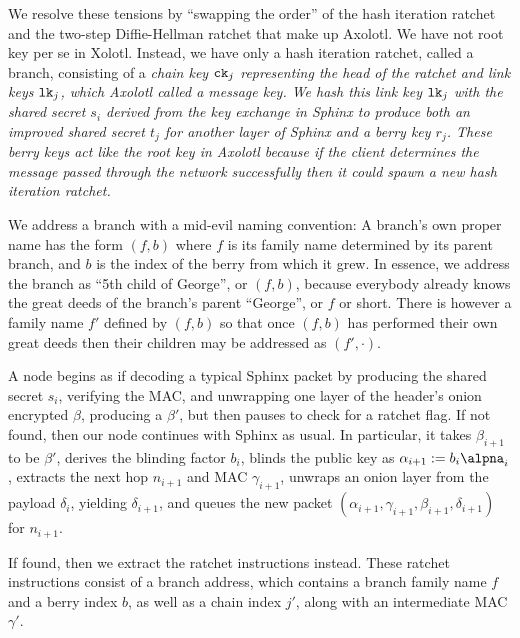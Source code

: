 \documentclass[twoside,letterpaper]{llncs}
\begin{document}
We resolve these tensions by ``swapping the order'' of the hash
iteration ratchet and the two-step Diffie-Hellman ratchet that make
up Axolotl.   
%
We have not root key per se in Xolotl.  
Instead, we have only a hash iteration ratchet, called a branch,
consisting of a \em{chain key} $\texttt{ck}_j$ representing the head of the
ratchet and \em{link keys} $\texttt{lk}_j$, which Axolotl called a message
key.  We hash this link key $\texttt{lk}_j$ with the shared secret $s_i$
derived from the key exchange in Sphinx to produce both an improved
shared secret $t_j$ for another layer of Sphinx and a \em{berry key} $r_j$. 
These berry keys act like the root key in Axolotl because if the
client determines the message passed through the network successfully
then it could spawn a new hash iteration ratchet.

We address a branch with a mid-evil naming convention: 
A branch's own proper name has the form $(f,b)$ where
 $f$ is its family name determined by its parent branch, and
 $b$ is the index of the berry from which it grew.
In essence, we address the branch as ``5th child of George'',
or $(f,b)$, because everybody already knows the great deeds
of the branch's parent ``George'', or $f$ or short. 
There is however a family name $f'$ defined by $(f,b)$ so that
once $(f,b)$ has performed their own great deeds then their
children may be addressed as $(f',\cdot)$.

\smallskip {} 

A node begins as if decoding a typical Sphinx packet by
 producing the shared secret $s_i$, verifying the MAC, and 
 unwrapping one layer of the header's onion encrypted $\beta$,
producing a $\beta'$,
but then pauses to check for a ratchet flag. 
If not found, then our node continues with Sphinx as usual.
In particular, it takes $\beta_{i+1}$ to be $\beta'$,
derives the blinding factor $b_i$,
blinds the public key as $\alpha_{i+1} := b_i \alpna_i$,
extracts the next hop $n_{i+1}$ and MAC $\gamma_{i+1}$,
unwraps an onion layer from the payload $\delta_i$,
 yielding $\delta_{i+1}$, and queues the new packet
$(\alpha_{i+1},\gamma_{i+1},\beta_{i+1},\delta_{i+1})$ for $n_{i+1}$.

If found, then we extract the ratchet instructions instead.
These ratchet instructions consist of a branch address,
which contains a branch family name $f$ and a berry index $b$,
 as well as a chain index $j'$,
along with an intermediate MAC $\gamma'$.
\end{document}
